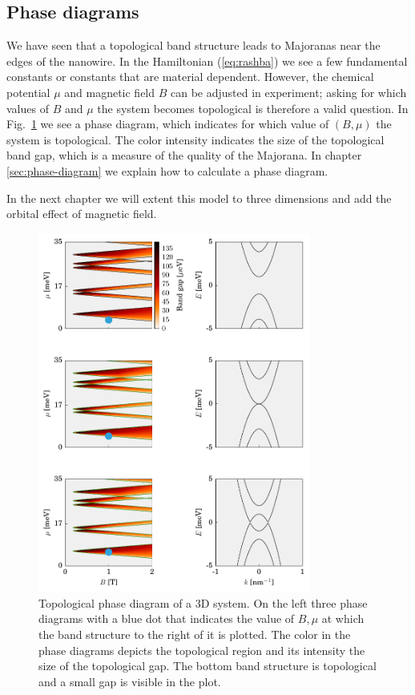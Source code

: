 \subsection{Phase diagrams}

We have seen that a topological band structure leads to Majoranas near the edges of the nanowire.
In the Hamiltonian (\ref{eq:rashba}) we see a few fundamental constants or constants that are material dependent.
However, the chemical potential $\mu$ and magnetic field $B$ can be adjusted in experiment; asking for which values of $B$ and $\mu$ the system becomes topological is therefore a valid question.
In Fig.~\ref{fig:topo_bands} we see a phase diagram, which indicates for which value of $\left(B,\mu\right)$ the system is topological.
The color intensity indicates the size of the topological band gap, which is a measure of the quality of the Majorana.
In chapter \ref{sec:phase-diagram} we explain how to calculate a phase diagram.

In the next chapter we will extent this model to three dimensions and add the orbital effect of magnetic field.

\begin{figure}
\begin{centering}
\includegraphics[width=0.8\textwidth]{chapter_introduction/figures/phase_diagrams_bands.pdf}
\par\end{centering}
\caption{Topological phase diagram of a 3D system.
On the left three phase diagrams with a blue dot that indicates the value of $B,\mu$ at which the band structure to the right of it is plotted.
The color in the phase diagrams depicts the topological region and its intensity the size of the topological gap.
The bottom band structure is topological and a small gap is visible in the plot.
\label{fig:topo_bands}}
\end{figure}


